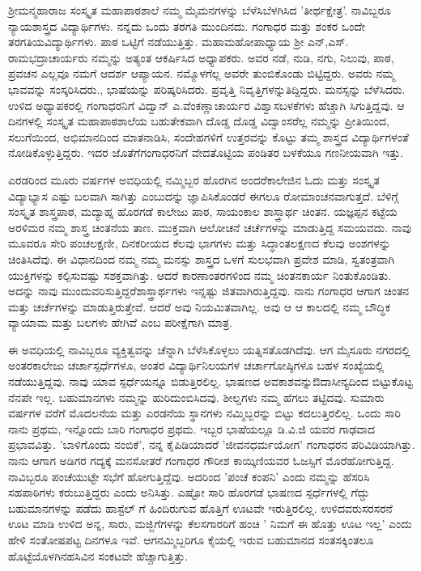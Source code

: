 {ಶ್ರೀಮನ್ಮಹಾರಾಜ ಸಂಸ್ಕೃತ ಮಹಾಪಾಠಶಾಲೆ ನಮ್ಮ ಮೈ\enginline{-}ಮನಗಳನ್ನು ಬೆಳೆಸಿ\break ಬೆಳಗಿಸಿದ 'ತೀರ್ಥಕ್ಷೇತ್ರ'. ನಾವಿಬ್ಬರೂ ನ್ಯಾಯಶಾಸ್ತ್ರದ ವಿದ್ಯಾರ್ಥಿಗಳು. ನನ್ನದು ಒಂದು ತರಗತಿ ಮುಂದಿನದು. ಗಂಗಾಧರ ಮತ್ತು ಶಂಕರ ಒಂದೇ ತರಗತಿಯ\break ವಿದ್ಯಾರ್ಥಿಗಳು. ಪಾಠ ಒಟ್ಟಿಗೆ  ನಡೆಯುತ್ತಿತ್ತು. ಮಹಾಮಹೋಪಾಧ್ಯಾಯ  ಶ್ರೀ ಎನ್,ಎಸ್. ರಾಮಭದ್ರಾಚಾರ್ಯರು ನಮ್ಮನ್ನು ಅತ್ಯಂತ ಆಕರ್ಷಿಸಿದ ಅಧ್ಯಾಪಕರು. ಅವರ ನಡೆ, ನುಡಿ, ನಗು, ನಿಲುವು, ಪಾಠ, ಪ್ರವಚನ ಎಲ್ಲವೂ ನಮಗೆ ಆದರ್ಶ\enginline{-} ಆಪ್ಯಾಯನ. ನಮ್ಮೊಳಗೆಲ್ಲ ಅವರೇ ತುಂಬಿಕೊಂಡು ಬಿಟ್ಟಿದ್ದರು. ಅವರು ನಮ್ಮ ಭಾವವನ್ನು ಸಂಸ್ಕರಿಸಿದರು., ಭಾಷೆಯನ್ನು ಪರಿಷ್ಕರಿಸಿದರು. ಪ್ರವೃತ್ತಿ ನಿವೃತ್ತಿಗಳನ್ನು\break ತಿದ್ದಿದ್ದರು. ಮನಸ್ಸನ್ನು ಬೆಳೆಸಿದರು. ಉಳಿದ ಅಧ್ಯಾಪಕರಲ್ಲಿ  ಗಂಗಾಧರನಿಗೆ ವಿದ್ವಾನ್ ಎ.ವೆಂಕಣ್ಣಾಚಾರ್ಯರ ವಿಶ್ವಾಸ\enginline{-}ಬಳಕೆಗಳು ಹೆಚ್ಚಾಗಿ ಸಿಗುತ್ತಿದ್ದವು. ಆ ದಿನಗಳಲ್ಲಿ ಸಂಸ್ಕೃತ  ಮಹಾಪಾಠಶಾಲೆಯ  ಬಹುತೇಕವಾಗಿ ದೊಡ್ಡ ದೊಡ್ಡ ವಿದ್ವಾಂಸರೆಲ್ಲ  ನಮ್ಮನ್ನು ಪ್ರೀತಿಯಿಂದ, ಸಲುಗೆಯಿಂದ, ಅಭಿಮಾನದಿಂದ ಮಾತನಾಡಿಸಿ, ಸಂದೇಹಗಳಿಗೆ ಉತ್ತರವನ್ನು ಕೊಟ್ಟು ತಮ್ಮ ಶಾಸ್ತ್ರದ ವಿದ್ಯಾರ್ಥಿಗಳಂತೆ ನೋಡಿಕೊಳ್ಳುತ್ತಿದ್ದರು. ಇದರ ಜೊತೆಗೆ\break ಗಂಗಾಧರನಿಗೆ ವೇದತೊಟ್ಟಿಯ  ಪಂಡಿತರ ಬಳಕೆಯೂ ಗಣನೀಯವಾಗಿ ಇತ್ತು. 

ಎರಡರಿಂದ ಮೂರು ವರ್ಷಗಳ ಅವಧಿಯಲ್ಲಿ ನಮ್ಮಿಬ್ಬರ ಹೊರಗಿನ  ಅಂದರೆ\break ಕಾಲೇಜಿನ ಓದು ಮತ್ತು ಸಂಸ್ಕೃತ ವಿದ್ಯಾಭ್ಯಾಸ ಎಷ್ಟು ಬಲವಾಗಿ ಸಾಗಿತ್ತು ಎಂಬುದನ್ನು  ಜ್ಞಾಪಿಸಿಕೊಂಡರೆ ಈಗಲೂ ರೋಮಾಂಚನವಾಗುತ್ತದೆ. ಬೆಳಿಗ್ಗೆ ಸಂಸ್ಕೃತ ಶಾಸ್ತ್ರಪಾಠ, ಮದ್ಯಾಹ್ನ ಹೊರಗಡೆ ಕಾಲೇಜು ಪಾಠ, ಸಾಯಂಕಾಲ ಶಾಸ್ತ್ರಾರ್ಥ ಚಿಂತನ. ಯಜ್ಞಪ್ಪನ ಕಟ್ಟೆಯ  ಅರಳಿಮರ ನಮ್ಮ ಶಾಸ್ತ್ರ ಚಿಂತನೆಯ ತಾಣ. ಮುಕ್ತವಾಗಿ ಆಲೋಚನೆ ಚರ್ಚೆ\-ಗಳನ್ನು ಮಾಡುತ್ತಿದ್ದ ಸಮಯವದು. ನಾವು ಮೂವರೂ ಸೇರಿ ಪಂಚಲಕ್ಷಣೀ, ದಿನಕರೀಯದ ಕೆಲವು ಭಾಗಗಳು ಮತ್ತು ಸಿದ್ಧಾಂತಲಕ್ಷಣದ ಕೆಲವು ಅಂಶಗಳನ್ನು ಚಿಂತಿಸಿದೆವು. ಈ  ವಿಧಾನದಿಂದ ನಮ್ಮ  ನಮ್ಮ ಮನಸ್ಸು  ಶಾಸ್ತ್ರದ ಒಳಗೆ ಸುಲಭವಾಗಿ ಪ್ರವೇಶ ಮಾಡಿ, ಸ್ವತಂತ್ರವಾಗಿ ಯುಕ್ತಿಗಳನ್ನು  ಕಲ್ಪಿಸುವಷ್ಟು ಸಶಕ್ತವಾಗಿತ್ತು. ಆದರೆ ಕಾರಣಾಂತರಗಳಿಂದ ನಮ್ಮ ಚಿಂತನಕಾರ್ಯ ನಿಂತುಕೊಂಡಿತು. ಅದನ್ನು ನಾವು ಮುಂದುವರಿಸುತ್ತಿದ್ದರೆ\break ಶಾಸ್ತ್ರಾರ್ಥಗಳು ಇನ್ನಷ್ಟು ಜಿತವಾಗಿರುತ್ತಿದ್ದವು. ನಾನು ಗಂಗಾಧರ ಆಗಾಗ ಚಿಂತನ ಮತ್ತು ಚರ್ಚೆಗಳನ್ನು ಮಾಡುತ್ತಿರುತ್ತೇವೆ. ಆದರೆ ಅವು ನಿಯಮಿತವಾಗಿಲ್ಲ. ಅವು ಆ ಆ ಕಾಲದಲ್ಲಿ ನಮ್ಮ ಬೌದ್ಧಿಕ ವ್ಯಾಯಾಮ ಮತ್ತು ಬಲಗಳು ಹೇಗಿವೆ ಎಂಬ ಪರೀಕ್ಷೆಗಾಗಿ ಮಾತ್ರ.

ಈ ಅವಧಿಯಲ್ಲಿ ನಾವಿಬ್ಬರೂ ವ್ಯಕ್ತಿತ್ವವನ್ನು ಚೆನ್ನಾಗಿ ಬೆಳೆಸಿಕೊಳ್ಳಲು ಯತ್ನಿಸ\-ತೊಡಗಿದೆವು. ಆಗ ಮೈಸೂರು ನಗರದಲ್ಲಿ ಅಂತರಕಾಲೇಜು ಚರ್ಚಾಸ್ಪರ್ಧೆಗಳೂ, ಅಂತರ ವಿದ್ಯಾರ್ಥಿನಿಲಯಗಳ ಚರ್ಚಾಗೋಷ್ಠಿಗಳೂ ಬಹಳ ಸಂಖ್ಯೆಯಲ್ಲಿ ನಡೆಯು\-ತ್ತಿದ್ದವು. ನಾವು ಯಾವ ಸ್ಪರ್ಧೆಯನ್ನೂ ಬಿಡುತ್ತಿರಲಿಲ್ಲ. ಭಾಷಣದ ಅವಕಾಶವನ್ನು\break ಔದಾಸೀನ್ಯದಿಂದ ಬಿಟ್ಟುಕೊಟ್ಟ ನೆನಪೇ ಇಲ್ಲ. ಬಹುಮಾನಗಳು ನಮ್ಮನ್ನು ಹುರಿದುಂಬಿ\-ಸಿದವು. ಶೀಲ್ಡಗಳು ನಮ್ಮ ಹೆಗಲು ತಟ್ಟಿದವು. ಸುಮಾರು ವರ್ಷಗಳ ವರೆಗೆ ಮೊದಲನೆಯ ಮತ್ತು ಎರಡನೆಯ ಸ್ಥಾನಗಳು ನಮ್ಮಿಬ್ಬರನ್ನು ಬಿಟ್ಟು ಕದಲುತ್ತಿರಲಿಲ್ಲ. ಒಂದು ಸಾರಿ ನಾನು ಪ್ರಥಮ, ಇನ್ನೊಂದು ಬಾರಿ ಗಂಗಾಧರ  ಪ್ರಥಮ. ಇಬ್ಬರ ಭಾಷೆಯಲ್ಲೂ ಡಿ.ವಿ.ಜಿ ಯವರ ಗಾಢವಾದ ಪ್ರಭಾವವಿತ್ತು. 'ಬಾಳಿಗೊಂದು ನಂಬಿಕೆ', ನನ್ನ ಕೈಪಿಡಿಯಾದರೆ 'ಜೀವನಧರ್ಮಯೋಗ' ಗಂಗಾಧರನ ಪರಿವಿಡಿಯಾಗಿತ್ತು. ನಾನು ಆಗಾಗ ಅಡಿಗರ ಗದ್ಯಕ್ಕೆ   ಮನಸೋತರೆ ಗಂಗಾಧರ ಗೌರೀಶ ಕಾಯ್ಕಿಣಿಯವರ ಓಜಸ್ಸಿಗೆ ಮೊರೆಹೋಗುತ್ತಿದ್ದ. ನಾವಿಬ್ಬರೂ ಪಂಚೆಯುಟ್ಟೇ ಸಭೆಗೆ ಹೋಗುತ್ತಿದ್ದೆವು. ಅದರಿಂದ 'ಪಂಚೆ ಕಂಪನಿ' ಎಂದು ನಮ್ಮನ್ನು ಹೆಸರಿಸಿ ಸಹಪಾಠಿಗಳು  ಕರುಬುತ್ತಿದ್ದರು ಎಂದು ಅನಿ\-ಸಿತ್ತು. ಎಷ್ಟೋ ಸಾರಿ ಹೊರಗಡೆ ಭಾಷಣದ ಸ್ಪರ್ಧೆಗಳಲ್ಲಿ ಗೆದ್ದು ಬಹುಮಾನಗಳನ್ನು ಪಡೆದು ಹಾಸ್ಟೆಲ್ ಗೆ  ಹಿಂದಿರುಗುವ  ಹೊತ್ತಿಗೆ ಊಟವೇ ಇರುತ್ತಿರಲಿಲ್ಲ. ಉಳಿದವರು\break ಸರಸರನೆ ಊಟ ಮಾಡಿ ಉಳಿದ ಅನ್ನ, ಸಾರು, ಮಜ್ಜಿಗೆಗಳನ್ನು ಕೆಲಸಗಾರರಿಗೆ ಹಂಚಿ ' ನಿಮಗೆ ಈ ಹೊತ್ತು ಊಟ ಇಲ್ಲ' ಎಂದು ಹೇಳಿ  ಸಂತೋಷಪಟ್ಟ ದಿನಗಳೂ ಇವೆ. ಆಗ\break ನಮ್ಮಿಬ್ಬರಿಗೂ ಕೈಯಲ್ಲಿ ಇರುವ ಬಹುಮಾನದ ಸಂತಸಕ್ಕಿಂತಲೂ ಹೊಟ್ಟೆಯೊಳಗಿನ\break ಹಸಿವಿನ ಸಂಕಟವೇ ಹೆಚ್ಚಾಗುತ್ತಿತ್ತು.

}
